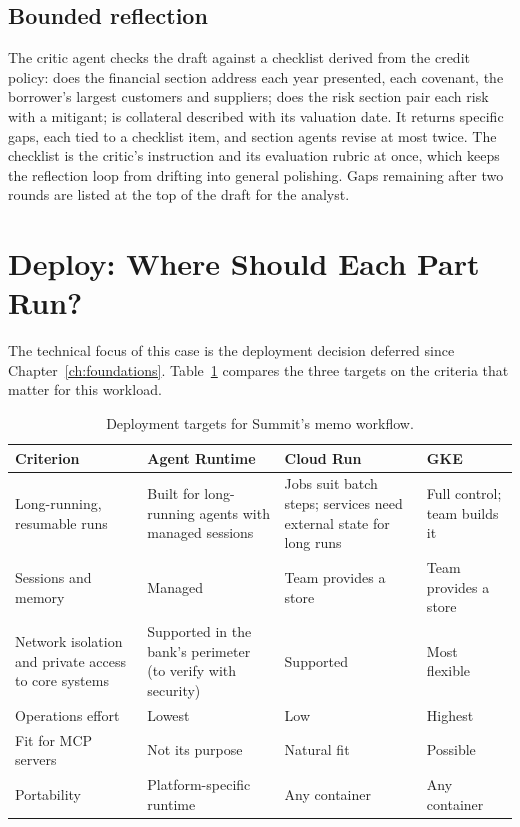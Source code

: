 \subsection{Bounded reflection}

The critic agent checks the draft against a checklist derived from the credit policy: does the financial section address each year presented, each covenant, the borrower's largest customers and suppliers; does the risk section pair each risk with a mitigant; is collateral described with its valuation date. It returns specific gaps, each tied to a checklist item, and section agents revise at most twice. The checklist is the critic's instruction and its evaluation rubric at once, which keeps the reflection loop from drifting into general polishing. Gaps remaining after two rounds are listed at the top of the draft for the analyst.

\section{Deploy: Where Should Each Part Run?}
\label{sec:loan-deploy}

The technical focus of this case is the deployment decision deferred since Chapter~\ref{ch:foundations}. Table~\ref{tab:loan-targets} compares the three targets on the criteria that matter for this workload.

\begin{table}[htbp]
\centering
\small
\caption{Deployment targets for Summit's memo workflow.}
\label{tab:loan-targets}
\begin{tabularx}{\textwidth}{@{}>{\raggedright\arraybackslash}p{3.2cm}>{\raggedright\arraybackslash}X>{\raggedright\arraybackslash}X>{\raggedright\arraybackslash}X@{}}
\toprule
\rowcolor{coHead} Criterion & Agent Runtime & Cloud Run & GKE \\
\midrule
Long-running, resumable runs & Built for long-running agents with managed sessions & Jobs suit batch steps; services need external state for long runs & Full control; team builds it \\
Sessions and memory & Managed & Team provides a store & Team provides a store \\
Network isolation and private access to core systems & Supported in the bank's perimeter (to verify with security) & Supported & Most flexible \\
Operations effort & Lowest & Low & Highest \\
Fit for MCP servers & Not its purpose & Natural fit & Possible \\
Portability & Platform-specific runtime & Any container & Any container \\
\bottomrule
\end{tabularx}
\end{table}

